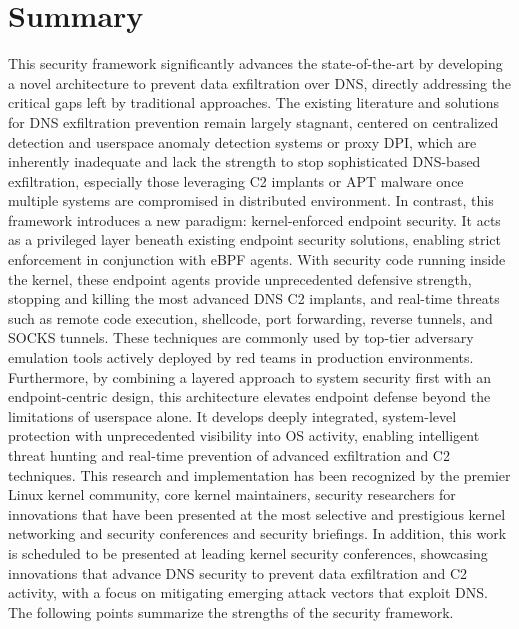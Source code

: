 \documentclass [11pt, proquest] {uwthesis}[2020/02/24]
\begin{document}
\section{Summary}
This security framework significantly advances the state-of-the-art by developing a novel architecture to prevent data exfiltration over DNS, directly addressing the critical gaps left by traditional approaches. The existing literature and solutions for DNS exfiltration prevention remain largely stagnant, centered on centralized detection and userspace anomaly detection systems or proxy DPI, which are inherently inadequate and lack the strength to stop sophisticated DNS-based exfiltration, especially those leveraging C2 implants or APT malware once multiple systems are compromised in distributed environment. In contrast, this framework introduces a new paradigm: kernel-enforced endpoint security. It acts as a privileged layer beneath existing endpoint security solutions, enabling strict enforcement in conjunction with eBPF agents. With security code running inside the kernel, these endpoint agents provide unprecedented defensive strength, stopping and killing the most advanced DNS C2 implants, and real-time threats such as remote code execution, shellcode, port forwarding, reverse tunnels, and SOCKS tunnels. These techniques are commonly used by top-tier adversary emulation tools actively deployed by red teams in production environments.
Furthermore, by combining a layered approach to system security first with an endpoint-centric design, this architecture elevates endpoint defense beyond the limitations of userspace alone. It develops deeply integrated, system-level protection with unprecedented visibility into OS activity, enabling intelligent threat hunting and real-time prevention of advanced exfiltration and C2 techniques. This research and implementation has been recognized by the premier Linux kernel community, core kernel maintainers, security researchers for innovations that have been presented at the most selective and prestigious kernel networking and security conferences and security briefings. In addition, this work is scheduled to be presented at leading kernel security conferences, showcasing innovations that advance DNS security to prevent data exfiltration and C2 activity, with a focus on mitigating emerging attack vectors that exploit DNS. The following points summarize the strengths of the security framework.
\end{document}
